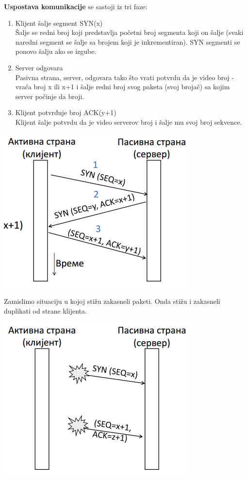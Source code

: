 \documentclass{article} %
\begin{document}
\textbf{Uspostava komunikacije} se sastoji iz tri faze:
\begin{enumerate}
  \item Klijent šalje segment SYN(x)\\
  Šalje se redni broj koji predstavlja početni broj segmenta koji on šalje (svaki naredni segment se šalje sa brojem koji je inkrementiran). SYN segmenti se ponovo šalju ako se izgube.
  \item Server odgovara \\
  Pasivna strana, server, odgovara tako što vrati potvrdu da je video broj - vraća broj x ili x+1 i šalje redni broj svog paketa (svoj brojač) sa kojim server počinje da broji.
  \item Klijent potvrđuje broj ACK(y+1) \\
  Klijent šalje potvrdu da je video serverov broj i šalje mu svoj broj sekvence.
\end{enumerate}
\begin{center}
	\includegraphics[scale=0.5]{veza}
\end{center}
Zamislimo situaciju u kojoj stižu zakasneli paketi. Onda stižu i zakasneli duplikati od strane klijenta.
\begin{center}
	\includegraphics[scale=0.5]{veza2}
\end{center}
\end{document}

